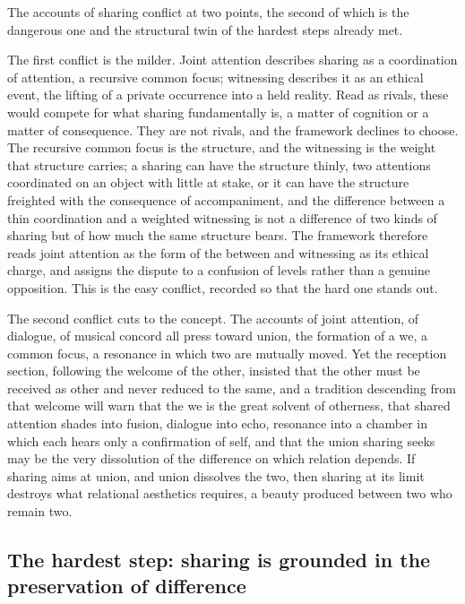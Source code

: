 The accounts of sharing conflict at two points, the second of which is the dangerous one and the structural twin of the hardest steps already met.

The first conflict is the milder. Joint attention describes sharing as a coordination of attention, a recursive common focus; witnessing describes it as an ethical event, the lifting of a private occurrence into a held reality. Read as rivals, these would compete for what sharing fundamentally is, a matter of cognition or a matter of consequence. They are not rivals, and the framework declines to choose. The recursive common focus is the structure, and the witnessing is the weight that structure carries; a sharing can have the structure thinly, two attentions coordinated on an object with little at stake, or it can have the structure freighted with the consequence of accompaniment, and the difference between a thin coordination and a weighted witnessing is not a difference of two kinds of sharing but of how much the same structure bears. The framework therefore reads joint attention as the form of the between and witnessing as its ethical charge, and assigns the dispute to a confusion of levels rather than a genuine opposition. This is the easy conflict, recorded so that the hard one stands out.

The second conflict cuts to the concept. The accounts of joint attention, of dialogue, of musical concord all press toward union, the formation of a we, a common focus, a resonance in which two are mutually moved. Yet the reception section, following the welcome of the other, insisted that the other must be received as other and never reduced to the same, and a tradition descending from that welcome will warn that the we is the great solvent of otherness, that shared attention shades into fusion, dialogue into echo, resonance into a chamber in which each hears only a confirmation of self, and that the union sharing seeks may be the very dissolution of the difference on which relation depends. If sharing aims at union, and union dissolves the two, then sharing at its limit destroys what relational aesthetics requires, a beauty produced between two who remain two.

\subsection{The hardest step: sharing is grounded in the preservation of difference}
\label{p22:sub:sharing-hardest}

